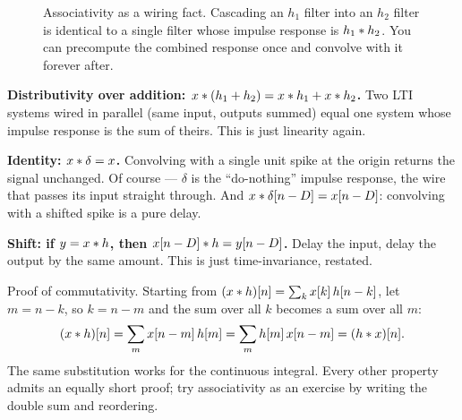 \begin{figure}[H]
\centering
{}
\caption{Associativity as a wiring fact. Cascading an $h_1$ filter into an $h_2$
filter is identical to a single filter whose impulse response is $h_1 \ast h_2$.
You can precompute the combined response once and convolve with it forever after.}
\label{ch13:fig-cascade}
\end{figure}

\textbf{Distributivity over addition:
$x \ast (h_1 + h_2) = x \ast h_1 + x \ast h_2$.} Two LTI systems wired in
parallel (same input, outputs summed) equal one system whose impulse response is
the sum of theirs. This is just linearity again.

\textbf{Identity: $x \ast \delta = x$.} Convolving with a single unit spike at
the origin returns the signal unchanged. Of course --- $\delta$ is the
``do-nothing'' impulse response, the wire that passes its input straight
through. And $x \ast \delta[n-D] = x[n-D]$: convolving with a shifted spike is
a pure delay.

\textbf{Shift: if $y = x \ast h$, then $x[n-D] \ast h = y[n-D]$.} Delay the
input, delay the output by the same amount. This is just time-invariance,
restated.

\begin{formalbox}
Proof of commutativity. Starting from $(x\ast h)[n] = \sum_k x[k]\,h[n-k]$,
let $m = n-k$, so $k = n-m$ and the sum over all $k$ becomes a sum over all $m$:
\[
(x\ast h)[n] = \sum_{m} x[n-m]\,h[m] = \sum_m h[m]\,x[n-m] = (h\ast x)[n].
\]
The same substitution works for the continuous integral. Every other property
admits an equally short proof; try associativity as an exercise by writing the
double sum and reordering.
\end{formalbox}

